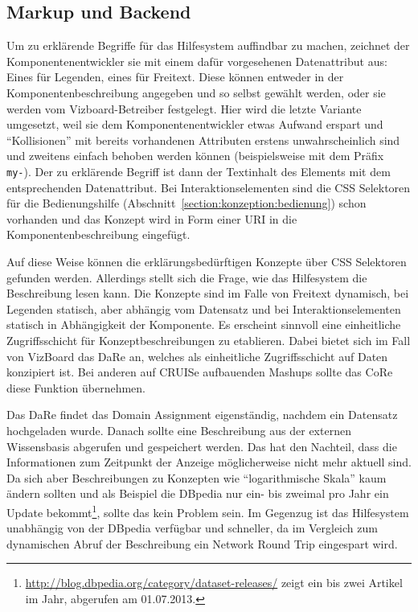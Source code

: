 \documentclass[
	headsepline,
	footsepline,
	fontsize=12pt,
	bibliography=totoc
]{scrbook}
\begin{document}
\subsection{Markup und Backend}
\label{section:konzeption:verlinkung:backend}

Um zu erklärende Begriffe für das Hilfesystem auffindbar zu machen, zeichnet der Komponentenentwickler sie mit einem dafür vorgesehenen Datenattribut aus: Eines für Legenden, eines für Freitext. Diese können entweder in der Komponentenbeschreibung angegeben und so selbst gewählt werden, oder sie werden vom Vizboard-Betreiber festgelegt. Hier wird die letzte Variante umgesetzt, weil sie dem Komponentenentwickler etwas Aufwand erspart und \enquote{Kollisionen} mit bereits vorhandenen Attributen erstens unwahrscheinlich sind und zweitens einfach behoben werden können (beispielsweise mit dem Präfix \texttt{my-}). Der zu erklärende Begriff ist dann der Textinhalt des Elements mit dem entsprechenden Datenattribut. Bei Interaktionselementen sind die CSS Selektoren für die Bedienungshilfe (Abschnitt~\ref{section:konzeption:bedienung}) schon vorhanden und das Konzept wird in Form einer URI in die Komponentenbeschreibung eingefügt.

Auf diese Weise können die erklärungsbedürftigen Konzepte über CSS Selektoren gefunden werden. Allerdings stellt sich die Frage, wie das Hilfesystem die Beschreibung lesen kann. Die Konzepte sind im Falle von Freitext dynamisch, bei Legenden statisch, aber abhängig vom Datensatz und bei Interaktionselementen statisch in Abhängigkeit der Komponente. Es erscheint sinnvoll eine einheitliche Zugriffsschicht für Konzeptbeschreibungen zu etablieren. Dabei bietet sich im Fall von VizBoard das DaRe an, welches als einheitliche Zugriffsschicht auf Daten konzipiert ist. Bei anderen auf CRUISe aufbauenden Mashups sollte das CoRe diese Funktion übernehmen.

Das DaRe findet das Domain Assignment eigenständig, nachdem ein Datensatz hochgeladen wurde. Danach sollte eine Beschreibung aus der externen Wissensbasis abgerufen und gespeichert werden. Das hat den Nachteil, dass die Informationen zum Zeitpunkt der Anzeige möglicherweise nicht mehr aktuell sind. Da sich aber Beschreibungen zu Konzepten wie \enquote{logarithmische Skala} kaum ändern sollten und als Beispiel die DBpedia nur ein- bis zweimal pro Jahr ein Update bekommt\footnote{\url{http://blog.dbpedia.org/category/dataset-releases/} zeigt ein bis zwei Artikel im Jahr, abgerufen am 01.07.2013.}, sollte das kein Problem sein. Im Gegenzug ist das Hilfesystem unabhängig von der DBpedia verfügbar und schneller, da im Vergleich zum dynamischen Abruf der Beschreibung ein Network Round Trip eingespart wird.
\end{document}
